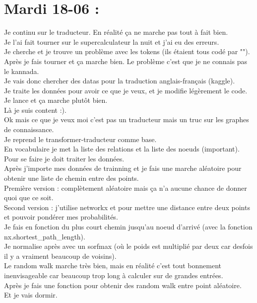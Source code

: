 \documentclass{article}
\begin{document}
\section*{Mardi 18-06 :}
Je continu sur le traducteur. En réalité ça ne marche pas tout à fait bien.\\
Je l'ai fait tourner sur le supercalculateur la nuit et j'ai eu des erreurs.\\
Je cherche et je trouve un problème avec les tokens (ils étaient tous codé par "").\\
Après je fais tourner et ça marche bien. Le problème c'est que je ne connais pas le kannada.\\
Je vais donc chercher des datas pour la traduction anglais-français (kaggle).\\
Je traite les données pour avoir ce que je veux, et je modifie légèrement le code. Je lance et ça marche plutôt bien.\\
Là je suis content :).\\
Ok mais ce que je veux moi c'est pas un traducteur mais un truc sur les graphes de connaissance.\\
Je reprend le transformer-traducteur comme base.\\
En vocabulaire je met la liste des relations et la liste des noeuds (important).\\
Pour se faire je doit traiter les données.\\
Après j'importe mes données de trainning et je fais une marche aléatoire pour obtenir une liste de chemin entre des points.\\
Première version : complètement aléatoire mais ça n'a aucune chance de donner quoi que ce soit.\\
Second version : j'utilise networkx et pour mettre une distance entre deux points et pouvoir pondérer mes probabilités.\\	
Je fais en fonction du plus court chemin jusqu'au noeud d'arrivé (avec la fonction nx.shortest\_path\_length).\\
Je normalise après avec un sorfmax (où le poids est multiplié par deux car desfois il y a vraiment beaucoup de voisins).\\
Le random walk marche très bien, mais en réalité c'est tout bonnement inenvisageable car beaucoup trop long à calculer sur de grandes entrées.\\
Après je fais une fonction pour obtenir des random walk entre point aléatoire.\\
Et je vais dormir.\\
\end{document}
